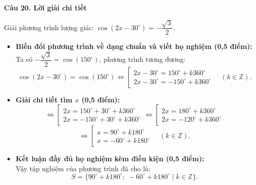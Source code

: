 \documentclass[12pt, a4paper]{article}
\begin{document}
\noindent\textbf{Câu 20. Lời giải chi tiết}\par
\begin{tcolorbox}[enhanced,breakable,colback=solutionbg,colframe=secondary!50!black,frame hidden,borderline west={3pt}{0pt}{secondary!50!black}]
Giải phương trình lượng giác: $\cos(2x - 30^\circ) = -\dfrac{\sqrt{3}}{2}$.
\begin{itemize}[leftmargin=1.5em]
\item \textbf{Biến đổi phương trình về dạng chuẩn và viết họ nghiệm (0,5 điểm):}\\
Ta có $-\dfrac{\sqrt{3}}{2} = \cos(150^\circ)$, phương trình tương đương:
$$\cos(2x - 30^\circ) = \cos(150^\circ) \Leftrightarrow \left[\begin{array}{l}
2x - 30^\circ = 150^\circ + k360^\circ \\[6pt]
2x - 30^\circ = -150^\circ + k360^\circ
\end{array}\right. \quad (k \in \mathbb{Z}).$$

\item \textbf{Giải chi tiết tìm $x$ (0,5 điểm):}
$$\Leftrightarrow \left[\begin{array}{l}
2x = 150^\circ + 30^\circ + k360^\circ \\[4pt]
2x = -150^\circ + 30^\circ + k360^\circ
\end{array}\right. \Leftrightarrow \left[\begin{array}{l}
2x = 180^\circ + k360^\circ \\[4pt]
2x = -120^\circ + k360^\circ
\end{array}\right.$$
$$\Leftrightarrow \left[\begin{array}{l}
x = 90^\circ + k180^\circ \\[4pt]
x = -60^\circ + k180^\circ
\end{array}\right. \quad (k \in \mathbb{Z}).$$

\item \textbf{Kết luận đầy đủ họ nghiệm kèm điều kiện (0,5 điểm):}\\
Vậy tập nghiệm của phương trình đã cho là:
$$S = \{90^\circ + k180^\circ;\; -60^\circ + k180^\circ \mid k \in \mathbb{Z}\}.$$
\end{itemize}
\end{tcolorbox}
\end{document}
